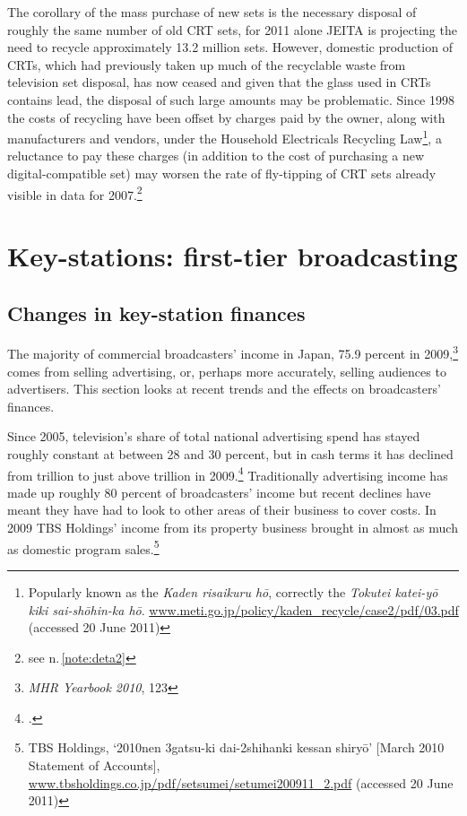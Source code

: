 \documentclass[11pt, oneside, a4paper, headsepline]{scrartcl}
\newcommand{\ty}{\textyen}
\begin{document}
\bigskip	

The corollary of the mass purchase of new sets is the necessary disposal of roughly the same number of old CRT sets, for 2011 alone JEITA is projecting the need to recycle approximately 13.2 million sets. However, domestic production of CRTs, which had previously taken up much of the recyclable waste from television set disposal, has now ceased and given that the glass used in CRTs contains lead, the disposal of such large amounts may be problematic. Since 1998 the costs of recycling have been offset by charges paid by the owner, along with manufacturers and vendors, under the Household Electricals Recycling Law\footnote{Popularly known as the \textit{Kaden risaikuru h\={o}}, correctly the \textit{Tokutei katei-y\={o} kiki sai-sh\={o}hin-ka h\={o}}.  \url{www.meti.go.jp/policy/kaden_recycle/case2/pdf/03.pdf}  (accessed 20 June 2011)}, a reluctance to pay these charges (in addition to the cost of purchasing a new digital-compatible set) may worsen the rate of fly-tipping of CRT sets already visible in data for 2007.\footnote{see n.\,\ref{note:deta2}}

\section{Key-stations: first-tier broadcasting}
\label{key-finances}

\subsection{Changes in key-station finances}
\label{spot-time}

The majority of commercial broadcasters' income in Japan, 75.9 percent in 2009,\footnote{\emph{MHR Yearbook 2010}, 123} comes from selling advertising, or, perhaps more accurately, selling audiences to advertisers. This section looks at recent trends and the effects on broadcasters' finances.

Since 2005, television's share of total national advertising spend has stayed roughly constant at between 28 and 30 percent, but in cash terms it has declined from \ty2.04 trillion to just above \ty1.71 trillion in 2009.\footcite{JMH:2011} Traditionally advertising income has made up roughly 80 percent of broadcasters' income but recent declines have meant they have had to look to other areas of their business to cover costs. In 2009 TBS Holdings' income from its property business brought in almost as much as domestic program sales.\footnote{TBS Holdings, `2010nen 3gatsu-ki dai-2shihanki kessan shiry\={o}' [March 2010 Statement of Accounts], \url{www.tbsholdings.co.jp/pdf/setsumei/setumei200911_2.pdf}  (accessed 20 June 2011)}
\end{document}
